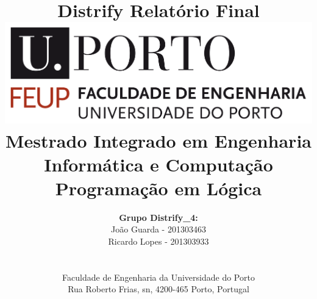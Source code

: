 \documentclass[a4paper]{article}
\begin{document}
\setlength{\parindent}{3em}
\setlength{\parskip}{1em}
\setlength{\textwidth}{16cm}
\setlength{\textheight}{22cm}

\title{\Huge\textbf{Distrify}\linebreak\linebreak\linebreak
\Large\textbf{Relatório Final}\linebreak\linebreak
\linebreak\linebreak
\includegraphics[scale=0.1]{feup-logo.png}\linebreak\linebreak
\linebreak\linebreak
\Large{Mestrado Integrado em Engenharia Informática e Computação} \linebreak\linebreak
\Large{Programação em Lógica}\linebreak
}
\author{\textbf{Grupo Distrify\_4:}\\
João Guarda - 201303463 \\
Ricardo Lopes - 201303933 \\
\linebreak\linebreak \\
 \\ Faculdade de Engenharia da Universidade do Porto \\ Rua Roberto Frias, s\/n, 4200-465 Porto, Portugal \linebreak\linebreak\linebreak
\linebreak\linebreak\vspace{1cm}}

\maketitle
\thispagestyle{empty}
\end{document}
